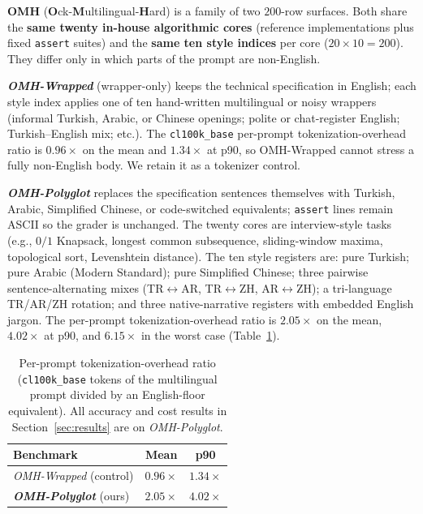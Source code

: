 \documentclass[11pt,a4paper,twocolumn]{article}
\begin{document}
\textbf{OMH} (\textbf{O}ck-\textbf{M}ultilingual-\textbf{H}ard) is a family of two $200$-row surfaces. Both share the \textbf{same twenty in-house algorithmic cores} (reference implementations plus fixed \texttt{assert} suites) and the \textbf{same ten style indices} per core ($20\times 10=200$). They differ only in which parts of the prompt are non-English.

\textbf{\textit{OMH-Wrapped}} (wrapper-only) keeps the technical specification in English; each style index applies one of ten hand-written multilingual or noisy wrappers (informal Turkish, Arabic, or Chinese openings; polite or chat-register English; Turkish--English mix; etc.). The \texttt{cl100k\_base} per-prompt tokenization-overhead ratio is $0.96\times$ on the mean and $1.34\times$ at p90, so OMH-Wrapped cannot stress a fully non-English body. We retain it as a tokenizer control.

\textbf{\textit{OMH-Polyglot}} replaces the specification sentences themselves with Turkish, Arabic, Simplified Chinese, or code-switched equivalents; \texttt{assert} lines remain ASCII so the grader is unchanged. The twenty cores are interview-style tasks (e.g., $0/1$ Knapsack, longest common subsequence, sliding-window maxima, topological sort, Levenshtein distance). The ten style registers are: pure Turkish; pure Arabic (Modern Standard); pure Simplified Chinese; three pairwise sentence-alternating mixes (TR$\leftrightarrow$AR, TR$\leftrightarrow$ZH, AR$\leftrightarrow$ZH); a tri-language TR/AR/ZH rotation; and three native-narrative registers with embedded English jargon. The per-prompt tokenization-overhead ratio is $\mathbf{2.05\times}$ on the mean, $4.02\times$ at p90, and $6.15\times$ in the worst case (Table~\ref{tab:tokenization-overhead-bench}).

\begin{table}[h]
\centering
\small
\begin{tabular}{lcc}
\toprule
\textbf{Benchmark} & \textbf{Mean} & \textbf{p90} \\
\midrule
\textit{OMH-Wrapped} (control) & $0.96\times$ & $1.34\times$ \\
\textbf{\textit{OMH-Polyglot}} (ours) & $\mathbf{2.05\times}$ & $\mathbf{4.02\times}$ \\
\bottomrule
\end{tabular}
\caption{Per-prompt tokenization-overhead ratio (\texttt{cl100k\_base} tokens of the multilingual prompt divided by an English-floor equivalent). All accuracy and cost results in Section~\ref{sec:results} are on \textit{OMH-Polyglot}.}
\label{tab:tokenization-overhead-bench}
\end{table}
\end{document}
